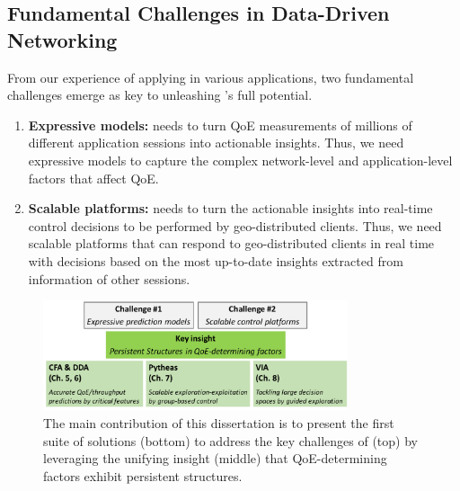 \subsection{Fundamental Challenges in Data-Driven Networking}
From our experience of applying \ddn in various applications, 
two fundamental challenges emerge as key to unleashing \ddn's full potential.

\begin{enumerate}

\item 
{\bf Expressive models:} 
\ddn needs to turn QoE measurements of millions of 
different application sessions into actionable insights.
Thus, we need expressive models to capture the complex network-level and 
application-level factors that affect QoE. 

\item 
{\bf Scalable platforms:}
\ddn needs to turn the actionable insights into 
real-time control decisions to be performed by
geo-distributed clients. 
Thus, we need scalable platforms that can respond to geo-distributed 
clients in real time with decisions based on the most up-to-date insights 
extracted from information of other sessions.

\end{enumerate}


\begin{figure}[t!]
\centering
\includegraphics[width=0.8\textwidth]{figures/intro-contribution.pdf}
\caption{The main contribution of this dissertation is to present the first suite of 
solutions (bottom) to address the key challenges of \ddn (top) by leveraging the 
unifying insight (middle) that QoE-determining factors exhibit persistent structures.}
\label{fig:intro-contribution}
\end{figure}


